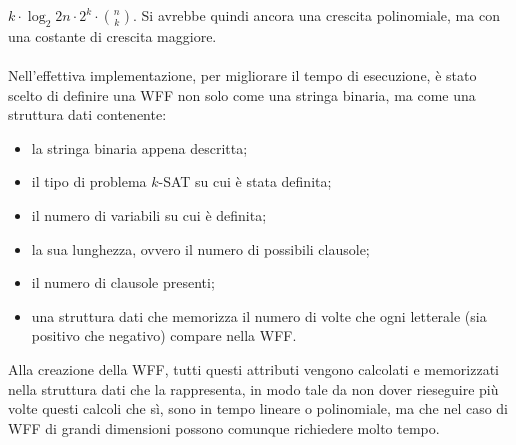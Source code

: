 $k \cdot \log_2 2n \cdot 2^k \cdot \binom{n}{k}$. Si avrebbe quindi ancora una crescita polinomiale, ma con 
una costante di crescita maggiore.\\
\\
Nell'effettiva implementazione, per migliorare il tempo di esecuzione, è stato scelto di definire una WFF 
non solo come una stringa binaria, ma come una struttura dati contenente:
\begin{itemize}
    \item la stringa binaria appena descritta;
    \item il tipo di problema $k$-SAT su cui è stata definita;
    \item il numero di variabili su cui è definita;
    \item la sua lunghezza, ovvero il numero di possibili clausole;
    \item il numero di clausole presenti;
    \item una struttura dati che memorizza il numero di volte che ogni letterale (sia 
    positivo che negativo) compare nella WFF.
\end{itemize}
Alla creazione della WFF, tutti questi attributi vengono calcolati e memorizzati 
nella struttura dati che la rappresenta, in modo tale da non dover rieseguire
più volte questi calcoli che sì, sono in tempo lineare o polinomiale, ma che 
nel caso di WFF di grandi dimensioni possono comunque richiedere molto
tempo.

